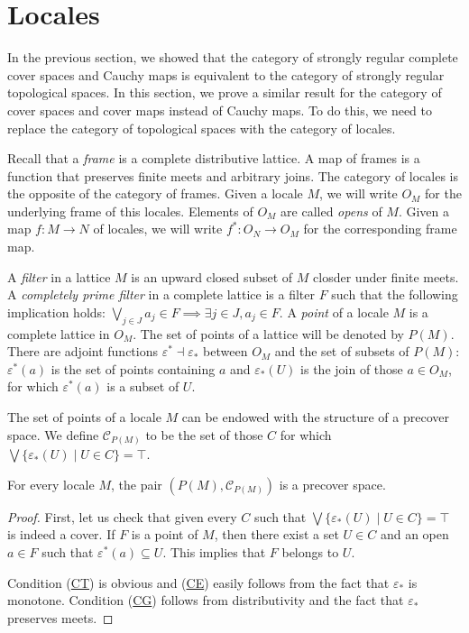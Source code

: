 \documentclass[reqno]{amsart}
\newcommand{\axref}[1]{(\hyperref[ax:#1]{#1})}
\theoremstyle{definition}
\theoremstyle{remark}
\numberwithin{figure}{section}
\begin{document}
\section{Locales}

In the previous section, we showed that the category of strongly regular complete cover spaces and Cauchy maps is equivalent to the category of strongly regular topological spaces.
In this section, we prove a similar result for the category of cover spaces and cover maps instead of Cauchy maps.
To do this, we need to replace the category of topological spaces with the category of locales.

Recall that a \emph{frame} is a complete distributive lattice.
A map of frames is a function that preserves finite meets and arbitrary joins.
The category of locales is the opposite of the category of frames.
Given a locale $M$, we will write $O_M$ for the underlying frame of this locales.
Elements of $O_M$ are called \emph{opens} of $M$.
Given a map $f : M \to N$ of locales, we will write $f^* : O_N \to O_M$ for the corresponding frame map.

A \emph{filter} in a lattice $M$ is an upward closed subset of $M$ closder under finite meets.
A \emph{completely prime filter} in a complete lattice is a filter $F$ such that the following implication holds: $\bigvee_{j \in J} a_j \in F \implies \exists j \in J, a_j \in F$.
A \emph{point} of a locale $M$ is a complete lattice in $O_M$.
The set of points of a lattice will be denoted by $P(M)$.
There are adjoint functions $\varepsilon^* \dashv \varepsilon_*$ between $O_M$ and the set of subsets of $P(M)$:
$\varepsilon^*(a)$ is the set of points containing $a$ and $\varepsilon_*(U)$ is the join of those $a \in O_M$, for which $\varepsilon^*(a)$ is a subset of $U$.

The set of points of a locale $M$ can be endowed with the structure of a precover space.
We define $\mathcal{C}_{P(M)}$ to be the set of those $C$ for which $\bigvee \{ \varepsilon_*(U) \mid U \in C \} = \top$.

\begin{prop}
For every locale $M$, the pair $(P(M),\mathcal{C}_{P(M)})$ is a precover space.
\end{prop}
\begin{proof}
First, let us check that given every $C$ such that $\bigvee \{ \varepsilon_*(U) \mid U \in C \} = \top$ is indeed a cover.
If $F$ is a point of $M$, then there exist a set $U \in C$ and an open $a \in F$ such that $\varepsilon^*(a) \subseteq U$.
This implies that $F$ belongs to $U$.

Condition \axref{CT} is obvious and \axref{CE} easily follows from the fact that $\varepsilon_*$ is monotone.
Condition \axref{CG} follows from distributivity and the fact that $\varepsilon_*$ preserves meets.
\end{proof}
\end{document}
